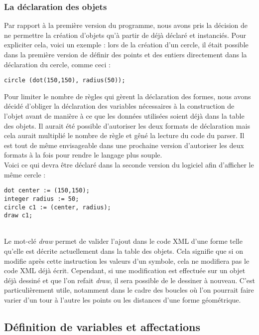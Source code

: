 			\subsubsection{La déclaration des objets}
			Par rapport à la première version du programme, nous avons pris la décision de ne permettre la création d'objets qu'à partir de déjà déclaré et instanciés. Pour expliciter cela, voici un exemple : lors de la création d'un cercle, il était possible dans la première version de définir des points et des entiers directement dans la déclaration du cercle, comme ceci :
\begin{lstlisting}[morekeywords={circle, dot, radius}]
circle (dot(150,150), radius(50));
\end{lstlisting}

			Pour limiter le nombre de règles qui gèrent la déclaration des formes, nous avons décidé d'obliger la déclaration des variables nécessaires à la construction de l'objet avant de manière à ce que les données utilisées soient déjà dans la table des objets. Il aurait été possible d'autoriser les deux formats de déclaration mais cela aurait multiplié le nombre de règle et gêné la lecture du code du parser. Il est tout de même envisageable dans une prochaine version d'autoriser les deux formats à la fois pour rendre le langage plus souple. \\
			
			Voici ce qui devra être déclaré dans la seconde version du logiciel afin d'afficher le même cercle : 
	
\begin{lstlisting}[morekeywords={circle, dot, integer, draw}]
dot center := (150,150);
integer radius := 50;
circle c1 := (center, radius);
draw c1;
\end{lstlisting}
			~\\
			Le mot-clé \emph{draw} permet de valider l'ajout dans le code XML d'une forme telle qu'elle est décrite actuellement dans la table des objets. Cela signifie que si on modifie après cette instruction les valeurs d'un symbole, cela ne modifiera pas le code XML déjà écrit. Cependant, si une modification est effectuée sur un objet déjà dessiné et que l'on refait \emph{draw}, il sera possible de le dessiner à nouveau. C'est particulièrement utile, notamment dans le cadre des boucles où l'on pourrait faire varier d'un tour à l'autre les points ou les distances d'une forme géométrique.

		\subsection{Définition de variables et affectations}
